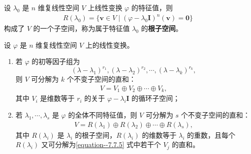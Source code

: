 \documentclass[../../main.tex]{subfiles}
\begin{document}
\begin{definition}[根子空间]
设 $\lambda_0$ 是 $n$ 维复线性空间 $V$ 上线性变换 $\varphi$ 的特征值，则
\begin{align*}
R(\lambda_0) = \{\boldsymbol{v} \in V \mid (\varphi - \lambda_0\boldsymbol{I})^n(\boldsymbol{v}) = \boldsymbol{0}\}
\end{align*}
构成了 $V$ 的一个子空间，称为属于特征值 $\lambda_0$ 的\textbf{根子空间}。 
\end{definition}

\begin{theorem}
设 $\varphi$ 是 $n$ 维复线性空间 $V$ 上的线性变换。
\begin{enumerate}[(1)]
\item 若 $\varphi$ 的初等因子组为
\[
(\lambda - \lambda_1)^{r_1}, (\lambda - \lambda_2)^{r_2}, \cdots, (\lambda - \lambda_k)^{r_k},
\]
则 $V$ 可分解为 $k$ 个不变子空间的直和：
\begin{align}
V = V_1 \oplus V_2 \oplus \cdots \oplus V_k, \label{equation--7.7.5}
\end{align}
其中 $V_i$ 是维数等于 $r_i$ 的关于 $\varphi - \lambda_i\boldsymbol{I}$ 的循环子空间；

\item 若 $\lambda_1, \cdots, \lambda_s$ 是 $\varphi$ 的全体不同特征值，则 $V$ 可分解为 $s$ 个不变子空间的直和：
\begin{align*}
V = R(\lambda_1) \oplus R(\lambda_2) \oplus \cdots \oplus R(\lambda_s), 
\end{align*}
其中 $R(\lambda_i)$ 是 $\lambda_i$ 的根子空间，$R(\lambda_i)$ 的维数等于 $\lambda_i$ 的重数，且每个 $R(\lambda_i)$ 又可分解为\eqref{equation--7.7.5} 式中若干个 $V_j$ 的直和。 
\end{enumerate} 
\end{theorem}
\end{document}
